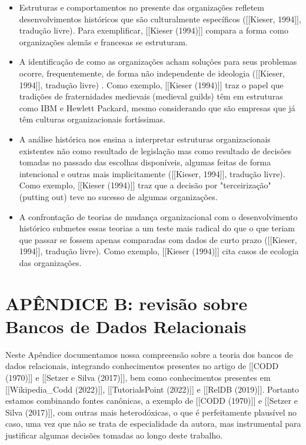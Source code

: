 \begin{itemize}
\item Estruturas e comportamentos no presente das organizações refletem desenvolvimentos históricos que são culturalmente específicos  ([[Kieser, 1994]], tradução livre). Para exemplificar,  [[Kieser (1994)]] compara a forma como organizações alemãs e francesas se estruturam.
\item A identificação de como as organizações acham soluções para seus problemas ocorre, frequentemente, de forma não independente de ideologia  ([[Kieser, 1994]], tradução livre) . Como exemplo,  [[Kieser (1994)]] traz o papel  que tradições de fraternidades medievais (medieval guilds) têm em estruturas como IBM e Hewlett Packard, mesmo considerando que são empresas que já têm culturas organizacionais fortíssimas.
\item A análise histórica nos ensina a interpretar estruturas organizacionais existentes não como resultado de legislação mas como resultado de decisões tomadas no passado das escolhas disponíveis, algumas feitas de forma intencional e outras mais implicitamente  ([[Kieser, 1994]], tradução livre). Como exemplo,  [[Kieser (1994)]] traz que a decisão por "terceirização" (putting out) teve no sucesso de algumas organizações.
\item A confrontação de teorias de mudança organizacional com o desenvolvimento histórico submetes essas teorias a um teste mais radical do que o que teriam que passar se fossem apenas comparadas com dados de curto prazo ([[Kieser, 1994]], tradução livre). Como exemplo,  [[Kieser (1994)]] cita casos de ecologia das organizações.
\end{itemize}

\chapter[APÊNDICE B: revisão sobre Bancos de Dados Relacionais]{APÊNDICE B: revisão sobre Bancos de Dados Relacionais}\label{APÊNDICE B: revisão sobre Bancos de Dados Relacionais}
Neste Apêndice documentamos nossa compreensão sobre a teoria dos bancos de dados relacionais, integrando conhecimentos presentes no artigo de  [[CODD (1970)]] e  [[Setzer e Silva (2017)]], bem como conhecimentos presentes em [[Wikipedia\_Codd (2022)]],  [[TutorialsPoint (2022)]] e  [[RelDB (2019)]]. Portanto estamos combinando fontes canônicas, a exemplo de  [[CODD (1970)]] e [[Setzer e Silva (2017)]], com outras mais heterodóxicas, o que é perfeitamente plausível no caso, uma vez que não se trata de especialidade da autora, mas instrumental para justificar algumas decisões tomadas ao longo deste trabalho.

